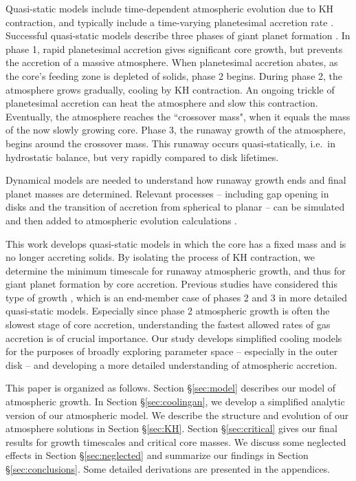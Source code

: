 \documentclass[apj, numberedappendix]{emulateapj}
\begin{document}
Quasi-static models include time-dependent atmospheric evolution due to KH contraction, and typically include a time-varying planetesimal accretion rate \citep{boden86, alibert05}.   Successful quasi-static models describe three phases of giant planet formation \citep{pollack96}.  In phase 1, rapid planetesimal accretion gives significant core growth, but prevents the accretion of a massive atmosphere.  When planetesimal accretion abates, as the core's feeding zone is depleted of solids, phase 2 begins.  During phase 2, the atmosphere grows gradually, cooling by KH contraction.  An ongoing trickle of planetesimal accretion can heat the atmosphere and slow this contraction.  Eventually, the atmosphere reaches the ``crossover mass", when it equals the mass of the now slowly growing core.  Phase 3, the runaway growth of the atmosphere, begins around the crossover mass.  This runaway occurs quasi-statically, i.e.\ in hydrostatic balance, but very rapidly compared to disk lifetimes. 

Dynamical models are needed to understand how runaway growth ends and final planet masses are determined.  Relevant processes -- including gap opening in disks and the transition of accretion from spherical to planar -- can be simulated and then added to atmospheric evolution calculations \citep{LisHub09}.

This work develops quasi-static models in which the core has a fixed mass and is no longer accreting solids.  By isolating the process of KH contraction, we determine the minimum timescale for runaway atmospheric growth, and thus for giant planet formation by core accretion.  Previous studies have considered this type of growth \citep{ikoma00, pn05}, which is an end-member case of phases 2 and 3 in more detailed quasi-static models.  Especially since phase 2 atmospheric growth is often the slowest stage of core accretion, understanding the fastest allowed rates of gas accretion is of crucial importance.  Our study develops simplified cooling models for the purposes of broadly exploring parameter space -- especially in the outer disk -- and developing a more detailed understanding of atmospheric accretion.

This paper is organized as follows. Section \S\ref{sec:model} describes our model of atmospheric growth.  In Section \S\ref{sec:coolingan}, we develop a simplified analytic version of our atmospheric model.  We describe the structure and evolution of our atmosphere solutions in Section \S\ref{sec:KH}.   Section \S\ref{sec:critical} gives our final results for growth timescales and critical core masses.  We discuss some neglected effects in Section \S\ref{sec:neglected} and summarize our findings in Section \S\ref{sec:conclusions}.  Some detailed derivations are presented in the appendices.
\end{document}
